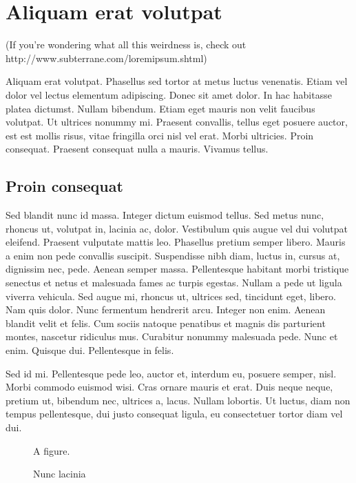 \chapter{Aliquam erat volutpat}

(If you're wondering what all this weirdness is, check out\\
http://www.subterrane.com/loremipsum.shtml)

Aliquam erat volutpat. Phasellus sed tortor at metus luctus venenatis.
Etiam vel dolor vel lectus elementum adipiscing. Donec sit amet dolor. In
hac habitasse platea dictumst. Nullam bibendum. Etiam eget mauris non velit
faucibus volutpat. Ut ultrices nonummy mi. Praesent convallis, tellus eget
posuere auctor, est est mollis risus, vitae fringilla orci nisl vel erat.
Morbi ultricies. Proin consequat. Praesent consequat nulla a mauris.
Vivamus tellus. 

\section{Proin consequat}

Sed blandit nunc id massa. Integer dictum euismod tellus. Sed metus nunc,
rhoncus ut, volutpat in, lacinia ac, dolor. Vestibulum quis augue
vel dui volutpat eleifend. Praesent vulputate mattis leo. Phasellus pretium
semper libero. Mauris a enim non pede convallis suscipit. Suspendisse nibh
diam, luctus in, cursus at, dignissim nec, pede. Aenean semper massa.
Pellentesque habitant morbi tristique senectus et netus et malesuada fames ac
turpis egestas. Nullam a pede ut ligula viverra vehicula. Sed augue mi,
rhoncus ut, ultrices sed, tincidunt eget, libero. Nam quis dolor. Nunc
fermentum hendrerit arcu. Integer non enim. Aenean blandit velit et felis. Cum
sociis natoque penatibus et magnis dis parturient montes, nascetur ridiculus
mus. Curabitur nonummy malesuada pede. Nunc et enim. Quisque dui. Pellentesque
in felis. 

Sed id mi. Pellentesque pede leo, auctor et, interdum eu, posuere semper,
nisl. Morbi commodo euismod wisi. Cras ornare mauris et erat. Duis neque
neque, pretium ut, bibendum nec, ultrices a, lacus. Nullam lobortis. Ut
luctus, diam non tempus pellentesque, dui justo consequat ligula, eu
consectetuer tortor diam vel dui. 

\begin{figure}
    \begin{center}
        A figure.
        \caption{Nunc lacinia}
    \end{center}
\end{figure}


